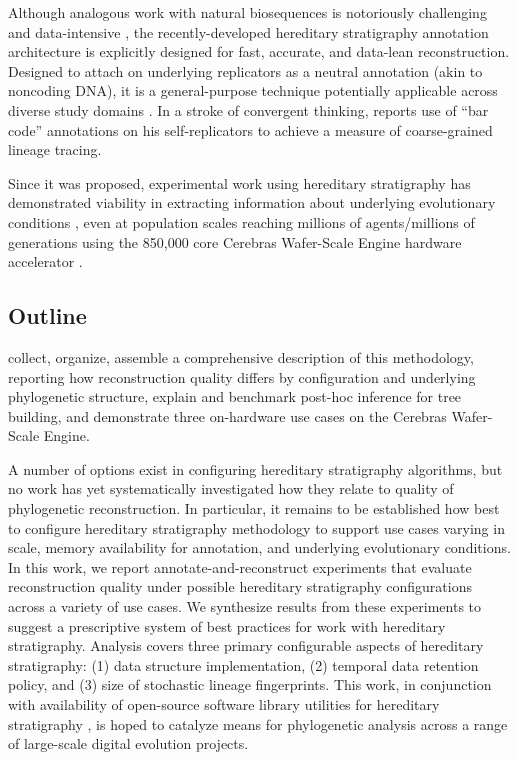 Although analogous work with natural biosequences is notoriously challenging and data-intensive \citep{neyman1971molecular,lemmon2013high},
the recently-developed hereditary stratigraphy annotation architecture is explicitly designed for fast, accurate, and data-lean reconstruction.
Designed to attach on underlying replicators as a neutral annotation (akin to noncoding DNA), it is a general-purpose technique potentially applicable across diverse study domains \citep{liben2008tracing,cohen1987computer,friggeri2014rumor}.
In a stroke of convergent thinking, \citet{ackley2023robust} reports use of ``bar code'' annotations on his self-replicators to achieve a measure of coarse-grained lineage tracing.

Since it was proposed, experimental work using hereditary stratigraphy has demonstrated viability in extracting information about underlying evolutionary conditions \citep{moreno2024ecology}, even at population scales reaching millions of agents/millions of generations using the 850,000 core Cerebras Wafer-Scale Engine hardware accelerator \citep{moreno2024trackable}.

\subsection{Outline}

collect, organize, assemble a comprehensive description of this methodology, reporting how reconstruction quality differs by configuration and underlying phylogenetic structure, explain and benchmark post-hoc inference for tree building, and demonstrate three on-hardware use cases on the Cerebras Wafer-Scale Engine.

A number of options exist in configuring hereditary stratigraphy algorithms, but no work has yet systematically investigated how they relate to quality of phylogenetic reconstruction.
In particular, it remains to be established how best to configure hereditary stratigraphy methodology to support use cases varying in scale, memory availability for annotation, and underlying evolutionary conditions.
In this work, we report annotate-and-reconstruct experiments that evaluate reconstruction quality under possible hereditary stratigraphy configurations across a variety of use cases.
We synthesize results from these experiments to suggest a prescriptive system of best practices for work with hereditary stratigraphy.
Analysis covers three primary configurable aspects of hereditary stratigraphy: (1) data structure implementation, (2) temporal data retention policy, and (3) size of stochastic lineage fingerprints.
This work, in conjunction with availability of open-source software library utilities for hereditary stratigraphy \citep{moreno2022hstrat}, is hoped to catalyze means for phylogenetic analysis across a range of large-scale digital evolution projects.

